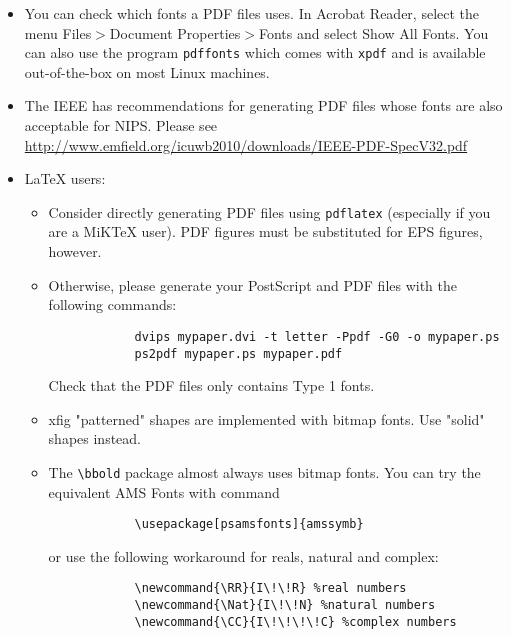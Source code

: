 \documentclass{article} %
\begin{document}
	\begin{itemize}
		
		\item You can check which fonts a PDF files uses.  In Acrobat Reader,
		select the menu Files$>$Document Properties$>$Fonts and select Show All Fonts. You can
		also use the program \verb+pdffonts+ which comes with \verb+xpdf+ and is
		available out-of-the-box on most Linux machines.
		
		\item The IEEE has recommendations for generating PDF files whose fonts
		are also acceptable for NIPS. Please see
		\url{http://www.emfield.org/icuwb2010/downloads/IEEE-PDF-SpecV32.pdf}
		
		\item LaTeX users:
		
		\begin{itemize}
			
			\item Consider directly generating PDF files using \verb+pdflatex+
			(especially if you are a MiKTeX user). 
			PDF figures must be substituted for EPS figures, however.
			
			\item Otherwise, please generate your PostScript and PDF files with the following commands:
			\begin{verbatim} 
			dvips mypaper.dvi -t letter -Ppdf -G0 -o mypaper.ps
			ps2pdf mypaper.ps mypaper.pdf
			\end{verbatim}
			
			Check that the PDF files only contains Type 1 fonts. 
			
			\item xfig "patterned" shapes are implemented with 
			bitmap fonts.  Use "solid" shapes instead. 
			\item The \verb+\bbold+ package almost always uses bitmap
			fonts.  You can try the equivalent AMS Fonts with command
			\begin{verbatim}
			\usepackage[psamsfonts]{amssymb}
			\end{verbatim}
			or use the following workaround for reals, natural and complex: 
			\begin{verbatim}
			\newcommand{\RR}{I\!\!R} %real numbers
			\newcommand{\Nat}{I\!\!N} %natural numbers 
			\newcommand{\CC}{I\!\!\!\!C} %complex numbers
			\end{verbatim}
			

\end{itemize}
\end{itemize}
\end{document}
